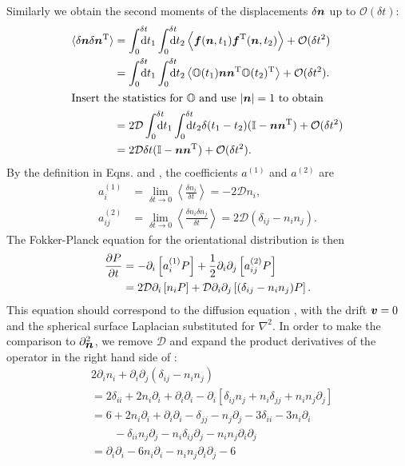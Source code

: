 \documentclass[thesis.tex]{subfiles}
\begin{document}
Similarly we obtain the second moments of the displacements $\delta \mbox{\boldmath$n$}$ up to $\mathcal O(\delta t)$:
\begin{align*}
	\langle \delta \ve n\delta \ve n\transpose\rangle &= \int_0^{\delta t}\!\!\!\!\!\rd t_1 \int_0^{\delta t}\!\!\!\!\!\rd t_2 \left\langle\ve f(\ve n,t_1) \ve f\transpose(\ve n, t_2)\right\rangle + \mathcal O(\delta t^2)\\
	&= \int_0^{\delta t}\!\!\!\!\!\rd t_1 \int_0^{\delta t}\!\!\!\!\!\rd t_2 \left\langle \ma O(t_1)\ve n\ve n\transpose \ma O(t_2)\transpose \right\rangle + \mathcal O(\delta t^2).\\
	\intertext{Insert the statistics for $\ma O$ and use $|\ve n|=1$ to obtain}
	&= 2\mathcal D \int_0^{\delta t}\!\!\!\!\!\rd t_1 \int_0^{\delta t}\!\!\!\!\!\rd t_2 \delta(t_1-t_2)(\ma I-\ve n\ve n\transpose) + \mathcal O(\delta t^2)\\
	&= 2\mathcal D \delta t (\ma I-\ve n\ve n\transpose) + \mathcal O(\delta t^2).\\
\end{align*}
By the definition in Eqns.  and , the coefficients $a^{(1)}$ and $a^{(2)}$ are
\begin{align*}
	a_i^{(1)} &= \lim_{\delta t\to0}\left\langle\frac{\delta n_i}{\delta t}\right\rangle = -2\mathcal D n_i,\\
	a_{ij}^{(2)} &= \lim_{\delta t\to0}\left\langle\frac{\delta n_i\delta  n_j}{\delta t}\right\rangle = 2\mathcal D(\delta_{ij} - n_i n_j).
\end{align*}
The Fokker-Planck equation for the orientational distribution is then
\begin{align}
	\frac{\partial P}{\partial t} &= -\partial_i\left[a^{(1)}_i P\right] + \frac{1}{2}\partial_i\partial_j\left[a^{(2)}_{ij} P\right]\\
&= 2\mathcal D\partial_i \left[n_i P\right] + \mathcal D\partial_i \partial_j\left[(\delta_{ij}-n_in_j) P\right].\eqnlab{fpe1}	
\end{align}
This equation should correspond to the diffusion equation , with the drift $\mbox{\boldmath$v$}=0$ and the spherical surface Laplacian  substituted for $\nabla^2$. In order to make the comparison to $\partial^2_{\mbox{\boldmath$n$}}$, we remove $\mathcal D$ and expand the product derivatives of the operator in the right hand side of :
\begin{align*}
	& 2\partial_i n_i + \partial_i \partial_j\left(\delta_{ij}-n_in_j\right)\\
	&= 2\delta_{ii} + 2n_i\partial_i + \partial_i\partial_i - \partial_i\left[\delta_{ij}n_j + n_i\delta_{jj}+ n_in_j\partial_j\right]\\
	&=6 + 2n_i\partial_i + \partial_i\partial_i-\delta_{jj}-n_j\partial_j-3\delta_{ii}-3n_i\partial_i\\
	&\qquad-\delta_{ii}n_j\partial_j-n_i\delta_{ij}\partial_j-n_in_j\partial_i\partial_j \\
	&= \partial_i\partial_i -6n_i\partial_i - n_in_j\partial_i\partial_j-6
\end{align*}
\end{document}
